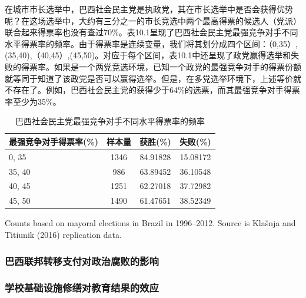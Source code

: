 \documentclass[cn,12pt,math=newtx,citestyle=gb7714-2015,bibstyle=gb7714-2015]{elegantbook}
\begin{document}
    在城市市长选举中，巴西社会民主党是执政党，其在市长选举中是否会获得优势呢？在这场选举中，大约有三分之一的市长竞选中两个最高得票的候选人（党派）联合起来得票率也没有查过70\%。表10.1呈现了巴西社会民主党最强竞争对手不同水平得票率的频率。由于得票率是连续变量，我们将其划分成四个区间：（0,35）,(35,40),（40,45）,(45,50)。对应于每个区间，表10.1中还呈现了政党赢得选举和失败的得票率。如果是一个两党竞选环境，已知一个政党的最强竞争对手的得票份额就等同于知道了该政党是否可以赢得选举。但是，在多党选举环境下，上述等价就不存在了。例如，巴西社会民主党的获得少于64\%的选票，而其最强竞争对手得票率至少为35\%。
    
    	\begin{table}[htbp]\centering
    	\scriptsize
    	\caption{巴西社会民主党最强竞争对手不同水平得票率的频率}
    	\label{Mrd}
    	\begin{center}
    		\begin{threeparttable}
    			\begin{tabular}{l*{3}{c}}
    				\toprule
    				\multicolumn{1}{l}{\textbf{最强竞争对手得票率(\%)}}&
    				\multicolumn{1}{c}{\textbf{样本量}}&
    				\multicolumn{1}{c}{获胜(\%)}&
    				\multicolumn{1}{c}{失败(\%)} \\
    				\midrule
    				0, 35	&1346&	84.91828&	15.08172\\
    				35, 40&	986&	63.89452	&36.10548\\
    				40, 45&	1251&	62.27018&	37.72982\\
    				45, 50&	1490&	61.47651&	38.52349\\
    				\bottomrule
    			\end{tabular}
    			\begin{tablenotes}
    				\tiny
    				\item  Counts based on mayoral elections in Brazil in 1996–2012. Source is Klašnja and Titiunik (2016) replication data.
    			\end{tablenotes}
    		\end{threeparttable}
    	\end{center}
    \end{table}
    
	
	\subsubsection{巴西联邦转移支付对政治腐败的影响}
	
	
	\subsubsection{学校基础设施修缮对教育结果的效应}
	
\end{document}
